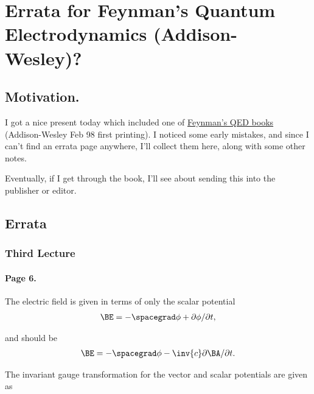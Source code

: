 
%

\chapter{Errata for Feynman's Quantum Electrodynamics (Addison-Wesley)?}
\label{chap:feynmanQEDerrata}
{}
\date{May 28, 2010}

\beginArtWithToc

\section{Motivation.}

I got a nice present today which included one of \href{http://www.amazon.com/Quantum-Electrodynamics-Advanced-Book-Classics/dp/0201360756/ref=sr_1_1?ie=UTF8&s=books&qid=1275092228&sr=8-1}{Feynman's QED books} (Addison-Wesley Feb 98 first printing).  I noticed some early mistakes, and since I can't find an errata page anywhere, I'll collect them here, along with some other notes.

Eventually, if I get through the book, I'll see about sending this into the publisher or editor.

\section{Errata}
\subsection{Third Lecture}
\subsubsection{Page 6.}

The electric field is given in terms of only the scalar potential
\begin{align*}
\BE = -\spacegrad \phi + \partial \phi/ \partial t,
\end{align*}

and should be
\begin{align*}
\BE = -\spacegrad \phi - \inv{c} \partial \BA/ \partial t.
\end{align*}

The invariant gauge transformation for the vector and scalar potentials are given as

